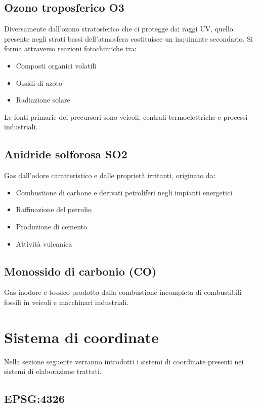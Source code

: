 \subsection{Ozono troposferico O3}

Diversamente dall'ozono stratosferico che ci protegge dai raggi UV, quello presente negli strati bassi dell'atmosfera
costituisce un inquinante secondario. Si forma attraverso reazioni fotochimiche tra:

\begin{itemize}
  \item Composti organici volatili
  \item Ossidi di azoto
  \item Radiazione solare
\end{itemize}

Le fonti primarie dei precursori sono veicoli, centrali termoelettriche e processi industriali.

\subsection{Anidride solforosa SO2}

Gas dall'odore caratteristico e dalle proprietà irritanti, originato da:

\begin{itemize}
  \item Combustione di carbone e derivati petroliferi negli impianti energetici
  \item Raffinazione del petrolio
  \item Produzione di cemento
  \item Attività vulcanica
\end{itemize}

\subsection{Monossido di carbonio (CO)}

Gas inodore e tossico prodotto dalla combustione incompleta di combustibili fossili in veicoli e macchinari industriali.

\section{Sistema di coordinate}

Nella sezione seguente verranno introdotti i sistemi di coordinate presenti nei sistemi di elaborazione trattati.

\subsection{EPSG:4326}

